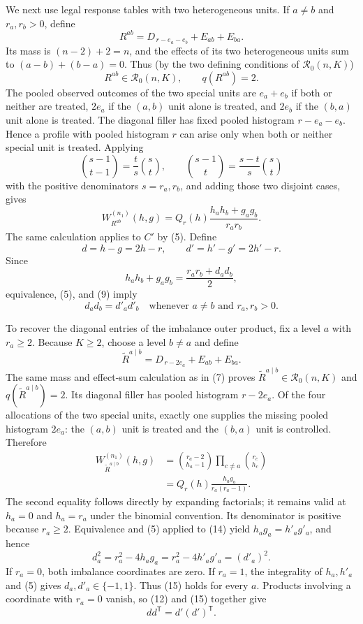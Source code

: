 We next use legal response tables with two heterogeneous units.  If
\(a\neq b\) and \(r_a,r_b>0\), define
\[
 R^{ab}=D_{\,r-e_a-e_b}+E_{ab}+E_{ba}.
 \tag{6}
\]
Its mass is \((n-2)+2=n\), and the effects of its two heterogeneous units
sum to \((a-b)+(b-a)=0\).  Thus (by the two defining conditions of
\(\mathcal R_0(n,K)\))
\[
 R^{ab}\in\mathcal R_0(n,K),
 \qquad q(R^{ab})=2.
 \tag{7}
\]
The pooled observed outcomes of the two special units are \(e_a+e_b\) if
both or neither are treated, \(2e_a\) if the \((a,b)\) unit alone is treated,
and \(2e_b\) if the \((b,a)\) unit alone is treated.  The diagonal filler has
fixed pooled histogram \(r-e_a-e_b\).  Hence a profile with pooled histogram
\(r\) can arise only when both or neither special unit is treated.  Applying
\[
 \binom{s-1}{t-1}=\frac{t}{s}\binom{s}{t},
 \qquad
 \binom{s-1}{t}=\frac{s-t}{s}\binom{s}{t}
 \tag{8}
\]
with the positive denominators \(s=r_a,r_b\), and adding those two disjoint
cases, gives
\[
 W_{R^{ab}}^{(n_1)}(h,g)
 =Q_r(h)\frac{h_ah_b+g_ag_b}{r_ar_b}.
 \tag{9}
\]
The same calculation applies to \(C'\) by (5).  Define
\[
 d=h-g=2h-r,\qquad d'=h'-g'=2h'-r.
 \tag{10}
\]
Since
\[
 h_ah_b+g_ag_b=\frac{r_ar_b+d_ad_b}{2},
 \tag{11}
\]
equivalence, (5), and (9) imply
\[
 d_ad_b=d'_ad'_b
 \quad\text{whenever }a\neq b\text{ and }r_a,r_b>0.
 \tag{12}
\]

To recover the diagonal entries of the imbalance outer product, fix a level
\(a\) with \(r_a\geq2\).  Because \(K\geq2\), choose a level \(b\neq a\)
and define
\[
 \widetilde R^{a\mid b}
 =D_{\,r-2e_a}+E_{ab}+E_{ba}.
 \tag{13}
\]
The same mass and effect-sum calculation as in (7) proves
\(\widetilde R^{a\mid b}\in\mathcal R_0(n,K)\) and
\(q(\widetilde R^{a\mid b})=2\).  Its diagonal filler has pooled histogram
\(r-2e_a\).  Of the four allocations of the two special units, exactly one
supplies the missing pooled histogram \(2e_a\): the \((a,b)\) unit is
treated and the \((b,a)\) unit is controlled.  Therefore
\[
 \begin{aligned}
 W_{\widetilde R^{a\mid b}}^{(n_1)}(h,g)
 &=\binom{r_a-2}{h_a-1}
   \prod_{c\neq a}\binom{r_c}{h_c}\\
 &=Q_r(h)\frac{h_ag_a}{r_a(r_a-1)}.
 \end{aligned}
 \tag{14}
\]
The second equality follows directly by expanding factorials; it remains
valid at \(h_a=0\) and \(h_a=r_a\) under the binomial convention.  Its
denominator is positive because \(r_a\geq2\).  Equivalence and (5) applied
to (14) yield \(h_ag_a=h'_ag'_a\), and hence
\[
 d_a^2=r_a^2-4h_ag_a
       =r_a^2-4h'_ag'_a=(d'_a)^2.
 \tag{15}
\]
If \(r_a=0\), both imbalance coordinates are zero.  If \(r_a=1\), the
integrality of \(h_a,h'_a\) and (5) gives
\(d_a,d'_a\in\{-1,1\}\).  Thus (15) holds for every \(a\).  Products
involving a coordinate with \(r_a=0\) vanish, so (12) and (15) together give
\[
 dd^{\mathsf T}=d'(d')^{\mathsf T}.
 \tag{16}
\]

